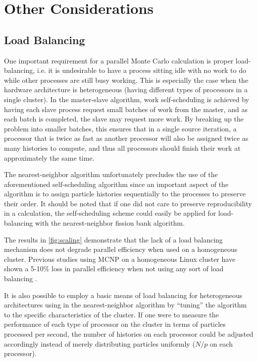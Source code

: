 \section{Other Considerations}
\label{sec:fission-bank-other}

\subsection{Load Balancing}

One important requirement for a parallel Monte Carlo calculation is proper
load-balancing, i.e. it is undesirable to have a process sitting idle with no
work to do while other processes are still busy working. This is especially the
case when the hardware architecture is heterogeneous (having different types of
processors in a single cluster). In the master-slave algorithm, work
self-scheduling is achieved by having each slave process request small batches
of work from the master, and as each batch is completed, the slave may request
more work. By breaking up the problem into smaller batches, this ensures that in
a single source iteration, a processor that is twice as fast as another
processor will also be assigned twice as many histories to compute, and thus all
processors should finish their work at approximately the same time.

The nearest-neighbor algorithm unfortunately precludes the use of the
aforementioned self-scheduling algorithm since an important aspect of the
algorithm is to assign particle histories sequentially to the processes to
preserve their order. It should be noted that if one did not care to preserve
reproducibility in a calculation, the self-scheduling scheme could easily be
applied for load-balancing with the nearest-neighbor fission bank algorithm.

The results in \autoref{fig:scaling} demonstrate that the lack of a load
balancing mechanism does not degrade parallel efficiency when used on a
homogeneous cluster. Previous studies using MCNP on a homogeneous Linux cluster
have shown a 5-10\% loss in parallel efficiency when not using any sort of load
balancing \cite{lanl-brown-2005}.

It is also possible to employ a basic means of load balancing for heterogeneous
architectures using in the nearest-neighbor algorithm by ``tuning'' the
algorithm to the specific characteristics of the cluster. If one were to measure
the performance of each type of processor on the cluster in terms of particles
processed per second, the number of histories on each processor could be
adjusted accordingly instead of merely distributing particles uniformly ($N/p$
on each processor).

